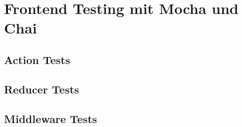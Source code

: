 \section{Frontend Testing mit Mocha und Chai}
\label{sec:t-frontend-testing-mit-mocha-und-chai'}

\subsection{Action Tests}
\label{sec:tf-action-tests}

\subsection{Reducer Tests}
\label{sec:tf-reducer-tests}

\subsection{Middleware Tests}
\label{sec:tf-middleware-tests}
